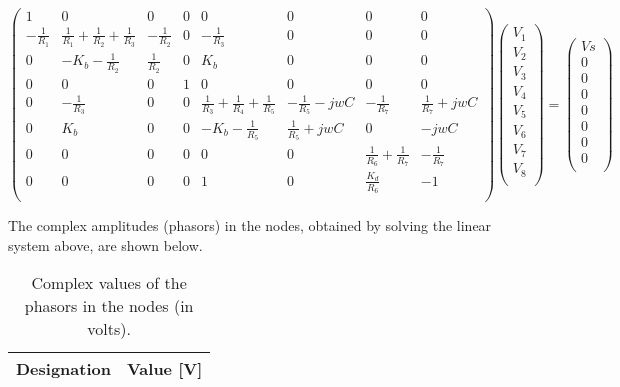 \begin{equation}
  \begin{pmatrix}
    1 & 0 & 0 & 0 & 0 & 0 & 0 & 0 \\
    -\frac{1}{R_1} & \frac{1}{R_1}+\frac{1}{R_2}+\frac{1}{R_3} & -\frac{1}{R_2} & 0 & -\frac{1}{R_3} & 0 & 0 & 0 \\
    0 & -K_b-\frac{1}{R_2} & \frac{1}{R_2} & 0 & K_b & 0 & 0 & 0 \\
    0 & 0 & 0 & 1 & 0 & 0 & 0 & 0 \\
    0 & -\frac{1}{R_3} & 0 & 0 & \frac{1}{R_3}+\frac{1}{R_4}+\frac{1}{R_5}  & -\frac{1}{R_5}-jwC & -\frac{1}{R_7} & \frac{1}{R_7}+jwC \\
    0 & K_b & 0 & 0 & -K_b-\frac{1}{R_5} & \frac{1}{R_5}+jwC & 0 & -jwC \\
    0 & 0 & 0 & 0 & 0 & 0 & \frac{1}{R_6}+\frac{1}{R_7} & -\frac{1}{R_7} \\
    0 & 0 & 0 & 0 & 1 & 0 & \frac{K_d}{R_6} & -1 \\
  \end{pmatrix}
  \begin{pmatrix}
    V_1  \\
    V_2  \\
    V_3  \\
    V_4  \\
    V_5  \\
    V_6  \\
    V_7  \\
    V_8  \\
  \end{pmatrix}
  =
  \begin{pmatrix}
    Vs  \\
    0   \\
    0   \\
    0   \\
    0   \\
    0  \\
    0   \\
    0   \\
  \end{pmatrix}
  \label{eq:Exercise4LinearSystem}
\end{equation}


The complex amplitudes (phasors) in the nodes, obtained by solving the linear system above, are shown below.

\begin{table}[H]
  \centering
  \begin{tabular}{|c|c|}
    \hline
        {\bf Designation} & {\bf Value [V]} \\ \hline
        
  \end{tabular}
  \caption{Complex values of the phasors in the nodes (in volts).}
  \label{tab:Exercise4Theoretical}
\end{table}

